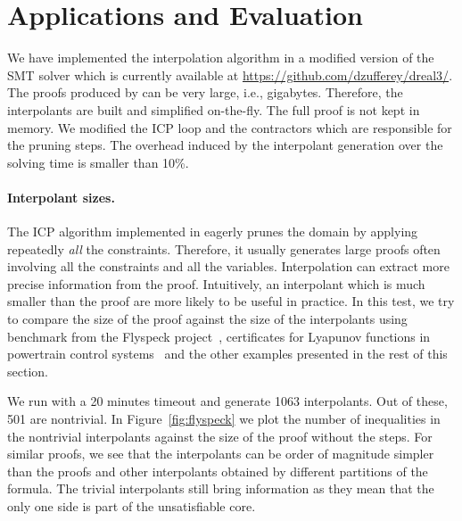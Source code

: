 \section{Applications and Evaluation}
\label{sec:eval}

We have implemented the interpolation algorithm in a modified version of the \dReal SMT solver which is currently available at \url{https://github.com/dzufferey/dreal3/}. %
The proofs produced by \dReal can be very large, i.e., gigabytes.
Therefore, the interpolants are built and simplified on-the-fly.
The full proof is not kept in memory.
We modified the ICP loop and the contractors which are responsible for the pruning steps.
The overhead induced by the interpolant generation over the solving time is smaller than 10\%.

\paragraph{Interpolant sizes.}
The ICP algorithm implemented in \dReal eagerly prunes the domain by applying repeatedly \emph{all} the constraints.
Therefore, it usually generates large proofs often involving all the constraints and all the variables.
Interpolation can extract more precise information from the proof.
Intuitively, an interpolant which is much smaller than the proof are more likely to be useful in practice.
In this test, we try to compare the size of the proof against the size of the interpolants using benchmark from the Flyspeck project~\cite{2015arXiv150102155H}, certificates for Lyapunov functions in powertrain control systems~\cite{DBLP:conf/hybrid/KapinskiDSA14} and the other examples presented in the rest of this section.


We run \dReal with a 20 minutes timeout and generate 1063 interpolants.
Out of these, 501 are nontrivial.
In Figure~\ref{fig:flyspeck} we plot the number of inequalities in the nontrivial interpolants against the size of the proof without the \weaken steps.
For similar proofs, we see that the interpolants can be order of magnitude simpler than the proofs and other interpolants obtained by different partitions of the formula.
The trivial interpolants still bring information as they mean that the only one side is part of the unsatisfiable core.


